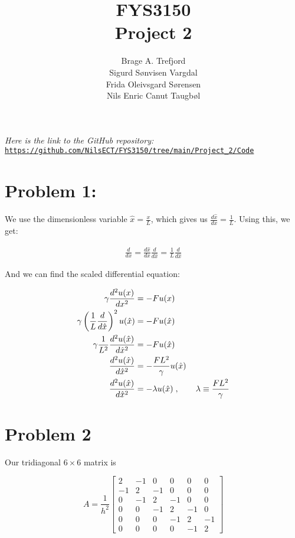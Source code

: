 \documentclass[english,notitlepage]{article}  %
\title{FYS3150\\Project 2}
\author{Brage A. Trefjord\\Sigurd Sønvisen Vargdal\\Frida Oleivsgard Sørensen\\Nils Enric Canut Taugbøl}
\begin{document}
\maketitle
\textit{Here is the link to the GitHub repository:} \texttt{\url{https://github.com/NilsECT/FYS3150/tree/main/Project_2/Code}}


\section*{Problem 1:}

We use the dimensionless variable $\hat{x} = \frac{x}{L}$, which gives us
$\frac{d \hat{x}}{dx} = \frac{1}{L}$. Using this, we get:

\begin{align*}
    \frac{d}{dx} = \frac{d\hat{x}}{dx} \frac{d}{d\hat{x}} = \frac{1}{L} \frac{d}{d\hat{x}}
\end{align*}

And we can find the scaled differential equation:

\begin{align*}
    \gamma \frac{d^2 u(x)}{dx^2} &= -F u(x)
    \\
    \gamma \left( \frac{1}{L} \frac{d}{d\hat{x}} \right)^2 u(\hat{x}) &= -F u(\hat{x})
    \\
    \gamma \frac{1}{L^2} \frac{d^2 u(\hat{x})}{d \hat{x}^2} &= -F u(\hat{x})
    \\
    \frac{d^2 u(\hat{x})}{d \hat{x}^2} &= - \frac{F L^2}{\gamma} u(\hat{x})
    \\
    \frac{d^2 u(\hat{x})}{d \hat{x}^2} &= - \lambda u(\hat{x}) \; , \hspace*{20pt} \lambda \equiv \frac{F L^2}{\gamma}
\end{align*}


\section*{Problem 2}

Our tridiagonal $6 \times 6$ matrix is

\begin{equation*}
    A = \frac{1}{h^2} \begin{bmatrix}
        2 & -1 & 0 & 0 & 0 & 0 \\
        -1 & 2 & -1 & 0 & 0 & 0 \\
        0 & -1 & 2 & -1 & 0 & 0 \\
        0 & 0 & -1 & 2 & -1 & 0 \\
        0 & 0 & 0 & -1 & 2 & -1 \\
        0 & 0 & 0 & 0 & -1 & 2
    \end{bmatrix}
\end{equation*}
\end{document}
